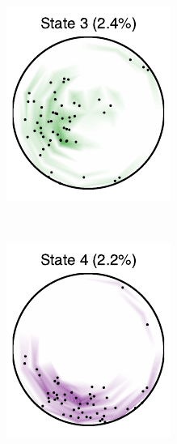 \documentclass[aos,noinfoline]{imsart} %
\begin{document}
\begin{figure}[t!]
\begin{subfigure}[T]{1.2in}
  \end{subfigure}
  ~
  \begin{subfigure}[T]{1.2in}
    \includegraphics[width=\textwidth]{state3}
  \end{subfigure}
    ~
  \begin{subfigure}[T]{1.2in}
    \includegraphics[width=\textwidth]{state4}

\end{subfigure}
\end{figure}
\end{document}
